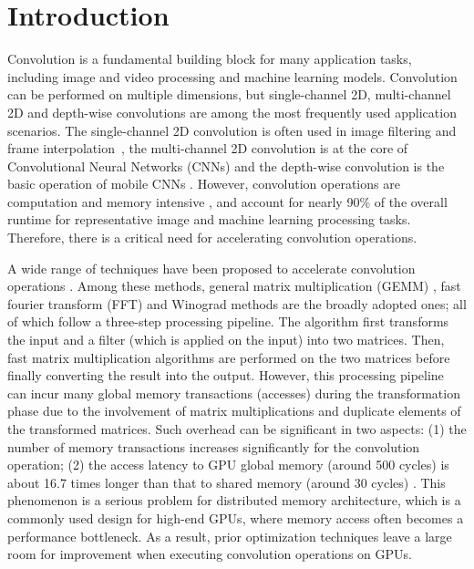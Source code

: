 \section{Introduction}
Convolution is a fundamental building block for many application tasks, including image and video processing and machine learning models. Convolution can be performed on multiple dimensions, {\color{red}but single-channel 2D, multi-channel 2D and depth-wise convolutions} are among the most frequently used application scenarios. 
{\color{red}The single-channel 2D convolution is often used in image filtering and frame interpolation~\cite{Perrot2014Fine,Ma2014Optimized,Rudi2015Image,Niklaus2017Video}, the multi-channel 2D convolution is at the core of Convolutional Neural Networks (CNNs) \cite{Krizhevsky2012ImageNet,SimonyanZ14a,HeZRS16,SzegedyLJSRAEVR15} and the depth-wise convolution is the basic operation of mobile CNNs \cite{Sandler_2018_CVPR,Ma_2018_ECCV,tan2019efficientnet}}. 
However, convolution operations are computation and memory intensive \cite{cavigelli2015accelerating}, and account for nearly 90\% of the overall runtime \cite{Li2016Performance} for representative image and machine learning processing tasks. Therefore, there is a critical need for accelerating convolution operations.


A wide range of techniques have been proposed to accelerate convolution operations \cite{Iandola2014Communication,vasilache2014fast,lavin2016fast,cho2017mec,Zhen2018Optimizing,Vasudevan2017Parallel,Chellapilla2006High,zhang2015dwarfcode}. Among these methods, general matrix multiplication (GEMM) \cite{Vasudevan2017Parallel,Chellapilla2006High}, fast fourier transform (FFT) \cite{vasilache2014fast} and Winograd \cite{lavin2016fast} methods are the broadly adopted ones;  all of which follow a three-step processing pipeline. The algorithm first transforms the input and a filter (which is applied on the input) into two matrices. Then, fast matrix multiplication algorithms \cite{karstadt2017matrix,scott2015matrix} are performed on the two matrices before finally converting the result into the output.
However, this processing pipeline can incur many {\color{red}global} memory transactions (accesses) during the
transformation phase due to the involvement of matrix multiplications and duplicate elements of the transformed
matrices. Such overhead can be significant {\color{red}in two aspects: (1) the number of memory transactions increases significantly for the convolution operation; (2) the access latency to GPU global memory (around 500 cycles) is about 16.7 times longer than that to shared memory (around 30 cycles) \cite{mei2016dissecting}}. This phenomenon is a serious problem for distributed memory
architecture, which is a commonly used design for high-end GPUs, where memory access often becomes a performance bottleneck. As a
result, prior optimization techniques leave a large room for improvement when executing convolution operations on GPUs.


